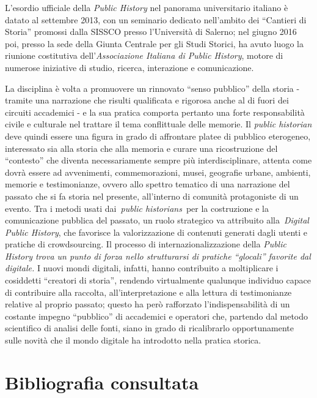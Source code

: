 \documentclass[
  b5paper,
  twoside,
  12pt,
  chapterprefix=false,
  bibliography=totocnumbered,
  parskip=false]{scrbook}
\begin{document}
L'esordio ufficiale della \emph{Public History} nel panorama universitario
italiano è datato al settembre 2013, con un seminario dedicato
nell'ambito dei \enquote{Cantieri di Storia} promossi dalla SISSCO presso
l'Università di Salerno; nel giugno 2016 poi, presso la sede della
Giunta Centrale per gli Studi Storici, ha avuto luogo la riunione
costitutiva dell'\emph{Associazione Italiana di Public History}, motore di
numerose iniziative di studio, ricerca, interazione e comunicazione.

La disciplina è volta a promuovere un rinnovato \enquote{senso pubblico} della
storia - tramite una narrazione che risulti qualificata e rigorosa anche
al di fuori dei circuiti accademici - e la sua pratica comporta pertanto
una forte responsabilità civile e culturale nel trattare il tema
conflittuale delle memorie. Il \emph{public historian} deve quindi essere una
figura in grado di affrontare platee di pubblico eterogeneo, interessato
sia alla storia che alla memoria e curare una ricostruzione del
\enquote{contesto} che diventa necessariamente sempre più interdisciplinare,
attenta come dovrà essere ad avvenimenti, commemorazioni, musei,
geografie urbane, ambienti, memorie e testimonianze, ovvero allo spettro
tematico di una narrazione del passato che si fa storia nel presente,
all'interno di comunità protagoniste di un evento. Tra i metodi usati
dai~\emph{public historians}~per la costruzione e la comunicazione pubblica
del passato, un ruolo strategico va attribuito alla~\emph{Digital Public
History}, che favorisce la valorizzazione di contenuti generati dagli
utenti e pratiche di crowdsourcing. Il processo di
internazionalizzazione della \emph{Public History trova un punto di forza
nello strutturarsi di pratiche \enquote{glocali} favorite dal digitale.} I nuovi
mondi digitali, infatti, hanno contribuito a moltiplicare i cosiddetti
\enquote{creatori di storia}, rendendo virtualmente qualunque individuo capace
di contribuire alla raccolta, all'interpretazione e alla lettura di
testimonianze relative al proprio passato; questo ha però rafforzato
l'indispensabilità di un costante impegno \enquote{pubblico} di accademici e
operatori che, partendo dal metodo scientifico di analisi delle fonti,
siano in grado di ricalibrarlo opportunamente sulle novità che il mondo
digitale ha introdotto nella pratica storica.

\hypertarget{bibliografia-consultata-5}{%
\section*{Bibliografia consultata}\label{bibliografia-consultata-5}}
\end{document}
